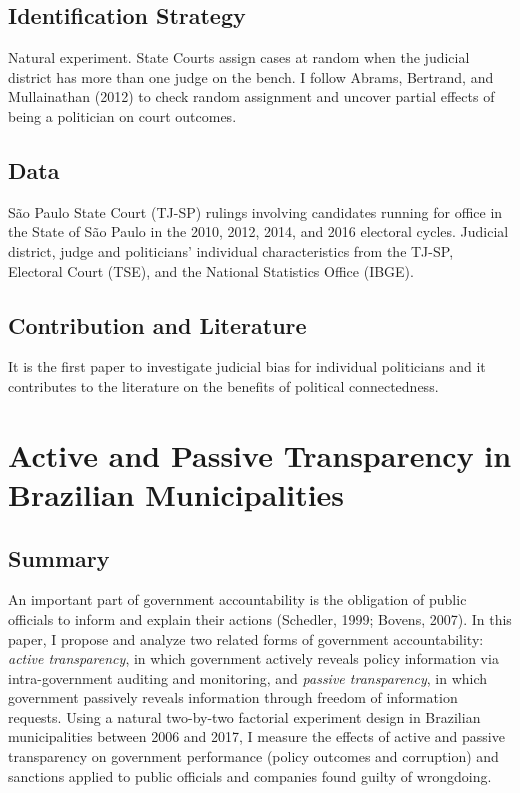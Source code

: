 \documentclass[]{article}
\begin{document}
\hypertarget{identification-strategy-1}{%
\subsection{Identification Strategy}\label{identification-strategy-1}}

Natural experiment. State Courts assign cases at random when the
judicial district has more than one judge on the bench. I follow Abrams,
Bertrand, and Mullainathan (2012) to check random assignment and uncover
partial effects of being a politician on court outcomes.

\hypertarget{data-1}{%
\subsection{Data}\label{data-1}}

São Paulo State Court (TJ-SP) rulings involving candidates running for
office in the State of São Paulo in the 2010, 2012, 2014, and 2016
electoral cycles. Judicial district, judge and politicians' individual
characteristics from the TJ-SP, Electoral Court (TSE), and the National
Statistics Office (IBGE).

\hypertarget{contribution-and-literature-1}{%
\subsection{Contribution and
Literature}\label{contribution-and-literature-1}}

It is the first paper to investigate judicial bias for individual
politicians and it contributes to the literature on the benefits of
political connectedness.

\hypertarget{title3}{%
\section{Active and Passive Transparency in Brazilian
Municipalities}\label{title3}}

\hypertarget{summary-2}{%
\subsection{Summary}\label{summary-2}}

An important part of government accountability is the obligation of
public officials to inform and explain their actions (Schedler, 1999;
Bovens, 2007). In this paper, I propose and analyze two related forms of
government accountability: \emph{active transparency}, in which
government actively reveals policy information via intra-government
auditing and monitoring, and \emph{passive transparency}, in which
government passively reveals information through freedom of information
requests. Using a natural two-by-two factorial experiment design in
Brazilian municipalities between 2006 and 2017, I measure the effects of
active and passive transparency on government performance (policy
outcomes and corruption) and sanctions applied to public officials and
companies found guilty of wrongdoing.
\end{document}
